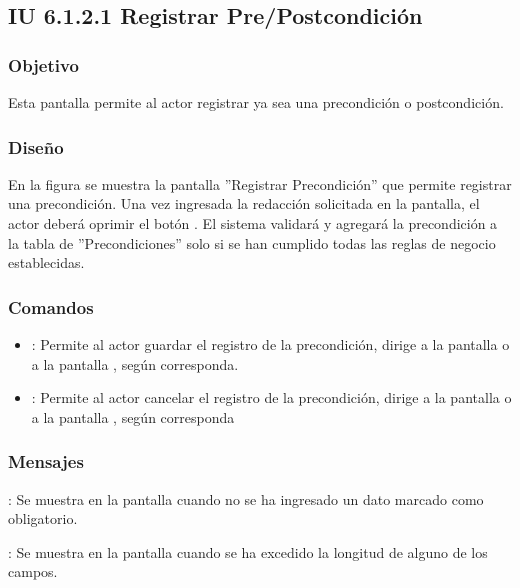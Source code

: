 \subsection{IU 6.1.2.1 Registrar Pre/Postcondición}

\subsubsection{Objetivo}
	Esta pantalla permite al actor registrar ya sea una precondición o postcondición.
\subsubsection{Diseño}
	En la figura  se muestra la pantalla ''Registrar Precondición'' que permite registrar una precondición. Una vez ingresada la redacción solicitada en la pantalla, el actor deberá oprimir el botón  . El sistema validará y agregará la precondición a la tabla de ''Precondiciones'' solo si se han cumplido todas las reglas de negocio establecidas.

\subsubsection{Comandos}
\begin{itemize}
	\item {}: Permite al actor guardar el registro de la precondición, dirige a la pantalla  o a la pantalla , según corresponda.
	\item {}: Permite al actor cancelar el registro de la precondición, dirige a la pantalla  o a la pantalla , según corresponda
\end{itemize}

\subsubsection{Mensajes}

\begin{Citemize}
	\item {}: Se muestra en la pantalla  cuando no se ha ingresado un dato marcado como obligatorio.
	\item {}: Se muestra en la pantalla  cuando se ha excedido la longitud de alguno de los campos.
\end{Citemize}
